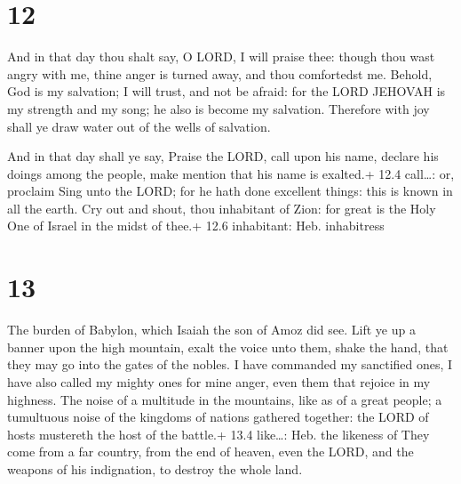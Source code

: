 \hypertarget{section-11}{%
\section{12}\label{section-11}}

 And in that day thou shalt say, O LORD, I will praise thee:
though thou wast angry with me, thine anger is turned away, and thou
comfortedst me.  Behold, God is my salvation; I will trust,
and not be afraid: for the LORD JEHOVAH is my strength and my song; he
also is become my salvation.  Therefore with joy shall ye
draw water out of the wells of salvation.

 And in that day shall ye say, Praise the LORD, call upon
his name, declare his doings among the people, make mention that his
name is exalted.+ 12.4 call\ldots: or, proclaim  Sing unto
the LORD; for he hath done excellent things: this is known in all the
earth.  Cry out and shout, thou inhabitant of Zion: for
great is the Holy One of Israel in the midst of thee.+ 12.6 inhabitant:
Heb. inhabitress

\hypertarget{section-12}{%
\section{13}\label{section-12}}

 The burden of Babylon, which Isaiah the son of Amoz did
see.  Lift ye up a banner upon the high mountain, exalt the
voice unto them, shake the hand, that they may go into the gates of the
nobles.  I have commanded my sanctified ones, I have also
called my mighty ones for mine anger, even them that rejoice in my
highness.  The noise of a multitude in the mountains, like
as of a great people; a tumultuous noise of the kingdoms of nations
gathered together: the LORD of hosts mustereth the host of the battle.+
13.4 like\ldots: Heb. the likeness of  They come from a far
country, from the end of heaven, even the LORD, and the weapons of his
indignation, to destroy the whole land.

